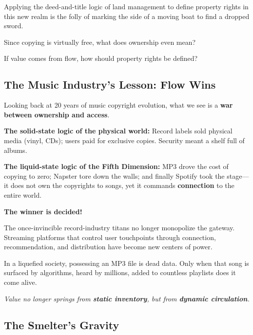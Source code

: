 Applying the deed-and-title logic of land management to define property rights in this new realm is the folly of marking the side of a moving boat to find a dropped sword.

\begin{thinkbox}[Reflection]
    Since copying is virtually free, what does ownership even mean?

    If value comes from flow, how should property rights be defined?
\end{thinkbox}

\subsection{The Music Industry's Lesson: Flow Wins}

Looking back at 20 years of music copyright evolution, what we see is a \textbf{war between ownership and access}.

\textbf{The solid-state logic of the physical world:} Record labels sold physical media (vinyl, CDs); users paid for exclusive copies. Security meant a shelf full of albums.


\textbf{The liquid-state logic of the Fifth Dimension:} MP3 drove the cost of copying to zero; Napster tore down the walls; and finally Spotify took the stage---it does not own the copyrights to songs, yet it commands \textbf{connection} to the entire world.

\vspace{1em}

\textbf{The winner is decided!}

The once-invincible record-industry titans no longer monopolize the gateway. Streaming platforms that control user touchpoints through connection, recommendation, and distribution have become new centers of power.

In a liquefied society, possessing an MP3 file is dead data. Only when that song is surfaced by algorithms, heard by millions, added to countless playlists does it come alive.

\vspace{1em}

\textit{Value no longer springs from \textbf{static inventory}, but from \textbf{dynamic circulation}.}

\newpage

\subsection{The Smelter's Gravity}

